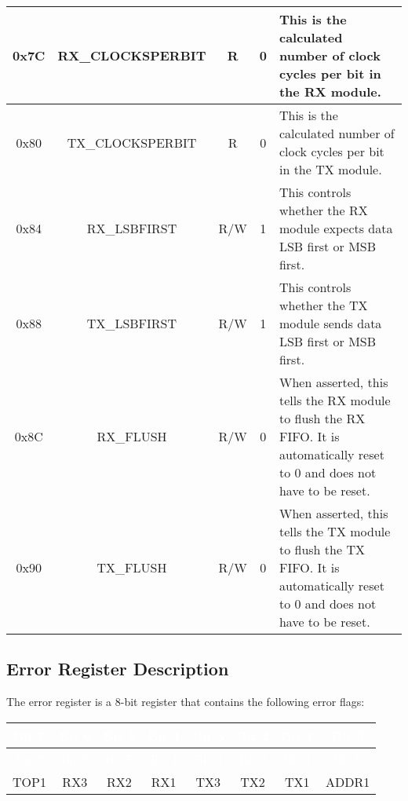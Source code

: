 \begin{longtable}{|c|c|c|c|p{}|}
    0x7C &
    RX\_CLOCKSPERBIT &
    R &
    0 &
    This is the calculated number of clock cycles per bit in the RX module.
    \\ \hline

    0x80 &
    TX\_CLOCKSPERBIT &
    R &
    0 &
    This is the calculated number of clock cycles per bit in the TX module.
    \\ \hline

    0x84 &
    RX\_LSBFIRST &
    R/W &
    1 &
    This controls whether the RX module expects data LSB first or MSB first.
    \\ \hline

    0x88 &
    TX\_LSBFIRST &
    R/W &
    1 &
    This controls whether the TX module sends data LSB first or MSB first.
    \\ \hline

    0x8C &
    RX\_FLUSH &
    R/W &
    0 &
    When asserted, this tells the RX module to flush the RX FIFO. It is automatically reset to 0 and does not have to be reset.
    \\ \hline

    0x90 &
    TX\_FLUSH &
    R/W &
    0 &
    When asserted, this tells the TX module to flush the TX FIFO. It is automatically reset to 0 and does not have to be reset.
    \\ \hline
\end{longtable}
\label{table:uart_register_map}
\endgroup

\subsection{Error Register Description}

The error register is a 8-bit register that contains the following error flags:
\renewcommand*{\arraystretch}{1.25}
\begingroup
\small
{}
\begin{longtable}{|c|c|c|c|c|c|c|c|}
    \hline
    \rowcolor{gray}
    \textcolor{white}{Bit 7} & \textcolor{white}{Bit 6} & \textcolor{white}{Bit 5} & \textcolor{white}{Bit 4} & \textcolor{white}{Bit 3} & \textcolor{white}{Bit 2} & \textcolor{white}{Bit 1} & \textcolor{white}{Bit 0} \\ \hline
    \endfirsthead

    \hline
    \rowcolor{gray}
    \textcolor{white}{Bit 7} & \textcolor{white}{Bit 6} & \textcolor{white}{Bit 5} & \textcolor{white}{Bit 4} & \textcolor{white}{Bit 3} & \textcolor{white}{Bit 2} & \textcolor{white}{Bit 1} & \textcolor{white}{Bit 0} \\ \hline
    \endhead

    \hline
    \endfoot

    TOP1 & RX3 & RX2 & RX1 & TX3 & TX2 & TX1 & ADDR1 \\ \hline
\end{longtable}
\label{table:uart_error}
\endgroup

